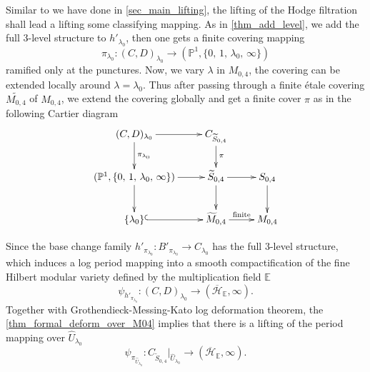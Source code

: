 \documentclass[12pt,twoside]{book}
\theoremstyle{plain}
\theoremstyle{definition}
\theoremstyle{remark}
\newcommand{\bP}{{\mathbb P}}
\numberwithin{equation}{section}
\def\EK{{\mathbb E}}
\begin{document}
Similar to we have done in \autoref{sec_main_lifting}, the lifting of the Hodge filtration shall lead a lifting some classifying mapping. As in \autoref{thm_add_level}, we add the full $3$-level structure to $h'_{\lambda_0}$, then one gets a finite covering mapping
\[\pi_{\lambda_0}: (C,D)_{\lambda_0}\to (\bP^1,\{0,\,1,\,\lambda_0,\,\infty\})\]
ramified only at the punctures. Now, we vary $\lambda$ in $M_{0,4}$, the covering can be extended locally around $\lambda=\lambda_0$. Thus after passing through a finite \'etale covering $\widetilde{M_{0,4}}$ of $M_{0,4}$, we extend the covering globally and get a finite cover $\pi$ as in the following Cartier diagram
\begin{equation*}
\xymatrix{
(C,D)_{\lambda_0} \ar[r] \ar[d]^{\pi_{\lambda_0}} & C_{\widetilde{S}_{0,4}} \ar[d]^{\pi} \\
(\bP^1,\{0,\,1,\,\lambda_0,\,\infty\}) \ar[r] \ar[d] & \widetilde{S}_{0,4} \ar[d] \ar[r] & S_{0,4} \ar[d]\\
\{\lambda_0\} \ar@{^(->}[r] & \widetilde{M}_{0,4} \ar[r]^{\text{finite}} & M_{0,4}\\
}
\end{equation*}

Since the base change family $h'_{\pi_{\lambda_0}}: B'_{\pi_{\lambda_0}}\to C_{\lambda_0}$ has the full $3$-level structure, which induces a log period mapping into a smooth compactification of the fine Hilbert modular variety defined by the multiplication field $\EK$
\[\psi_{h'_{\pi_{\lambda_0}}}: (C,D)_{\lambda_0}\to (\overline{\mathcal H}_{\EK},\infty).\]
Together with Grothendieck-Messing-Kato log deformation theorem, the \autoref{thm_formal_deform_over_M04} implies that there is a lifting of the period mapping over $\hat U_{\lambda_0}$
\[\psi_{\pi_{\hat U_{\lambda_0}}}: C_{\widetilde S_{0,4}}|_{\hat U_{\lambda_0}}\to (\overline{\mathcal H}_{\EK},\infty).\]
\end{document}

